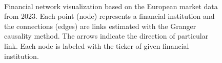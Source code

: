 \documentclass[12pt]{article}
\begin{document}
\begin{figure}%
	\centering
	\quad
	\\
	
	
	\caption{Financial network visualization based on the European market data from 2023. Each point (node) represents a financial institution and the connections (edges) are links estimated with the Granger causality method. The arrows indicate the direction of particular link. Each node is labeled with the ticker of given financial institution.}	\label{fig:actual_network}
\end{figure}
\end{document}
